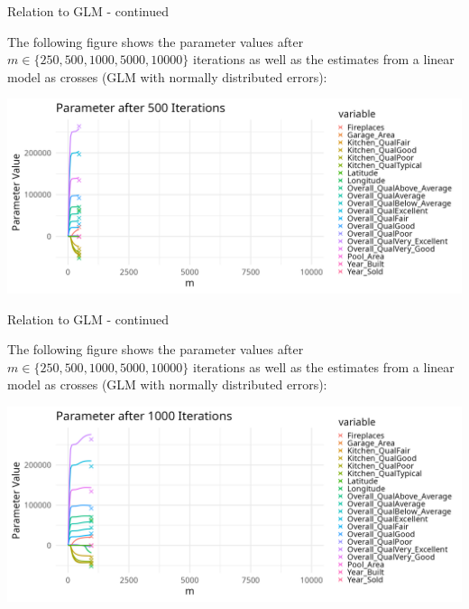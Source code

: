 \documentclass[11pt,compress,t,notes=noshow, xcolor=table]{beamer}
\begin{document}
\begin{vbframe}{Relation to GLM - continued}

The following figure shows the parameter values after $m \in \{250, 500, 1000, 5000, 10000\}$ iterations as well as the estimates from a linear model as crosses (GLM with normally distributed errors):

\begin{center}
\includegraphics[width=\textwidth]{figure/compboost-to-glm-iter500.png}
\end{center}

\end{vbframe}

\begin{vbframe}{Relation to GLM - continued}

The following figure shows the parameter values after $m \in \{250, 500, 1000, 5000, 10000\}$ iterations as well as the estimates from a linear model as crosses (GLM with normally distributed errors):

\begin{center}
\includegraphics[width=\textwidth]{figure/compboost-to-glm-iter1000.png}
\end{center}

\end{vbframe}
\end{document}
